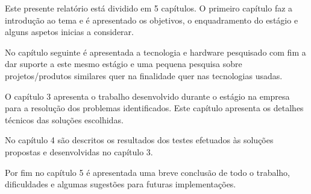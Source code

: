 \par Este presente relatório está dividido em 5 capítulos. O primeiro capítulo faz a introdução ao tema e é apresentado os objetivos, o enquadramento do estágio e alguns aspetos inicias a considerar. 
\par No capítulo seguinte é apresentada a tecnologia e hardware pesquisado com fim a dar suporte a este mesmo estágio e uma pequena pesquisa sobre projetos/produtos similares quer na finalidade quer nas tecnologias usadas. 
\par O capítulo 3 apresenta o trabalho desenvolvido durante o estágio na empresa para a resolução dos problemas identificados. Este capítulo apresenta  os detalhes técnicos das soluções escolhidas. 
\par No capítulo 4  são descritos os resultados dos testes efetuados às soluções propostas e desenvolvidas no capítulo 3.
\par Por fim no capítulo 5 é apresentada uma breve conclusão de todo o trabalho, dificuldades e algumas sugestões para futuras implementações. 


